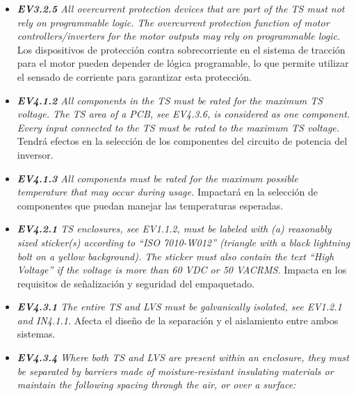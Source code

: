 \begin{itemize}
    \item \textit{\textbf{EV3.2.5} All overcurrent protection devices that are part of the TS must not rely on programmable logic. The overcurrent protection function of motor controllers/inverters for the motor outputs may rely on programmable logic.} Los dispositivos de protección contra sobrecorriente en el sistema de tracción para el motor pueden depender de lógica programable, lo que permite utilizar el sensado de corriente para garantizar esta protección.
    \item \textit{\textbf{EV4.1.2} All components in the TS must be rated for the maximum TS voltage. The TS area of a PCB, see EV4.3.6, is considered as one component. Every input connected to the TS must be rated to the maximum TS voltage.} Tendrá efectos en la selección de los componentes del circuito de potencia del inversor.
    \item \textit{\textbf{EV4.1.3}  All components must be rated for the maximum possible temperature that may occur during usage.} Impactará en la selección de componentes que puedan manejar las temperaturas esperadas.
    \item \textit{\textbf{EV4.2.1} TS enclosures, see EV1.1.2, must be labeled with (a) reasonably sized sticker(s) according to “ISO 7010-W012” (triangle with a black lightning bolt on a yellow background). The sticker must also contain the text “High Voltage” if the voltage is more than 60 VDC or 50 VACRMS.} Impacta en los requisitos de señalización y seguridad del empaquetado.
    \item \textit{\textbf{EV4.3.1} The entire TS and LVS must be galvanically isolated, see EV1.2.1 and IN4.1.1.} Afecta el diseño de la separación y el aislamiento entre ambos sistemas.
    \item \textit{\textbf{EV4.3.4} Where both TS and LVS are present within an enclosure, they must be separated by barriers made of moisture-resistant insulating materials or maintain the following spacing through the air, or over a surface:}


\end{itemize}

